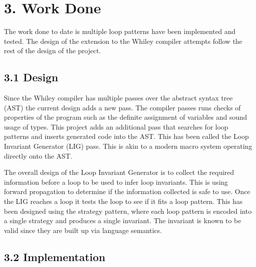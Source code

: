 \documentclass[11pt, a4paper, twoside, openright]{report}
\begin{document}
\section*{3. Work Done}

The work done to date is multiple loop patterns have been implemented and
tested. The design of the extension to the Whiley compiler attempts follow
the rest of the design of the project.

\subsection*{3.1 Design}

Since the Whiley compiler has multiple passes over the abstract syntax tree
(AST)
the current design adds a new pass. The compiler passes runs checks of properties
of the program such as the definite assignment of variables and sound usage of
types. This project adds an additional pass that searches for loop patterns and
inserts generated code into the AST.
This has been called the Loop Invariant Generator (LIG) pass.
This is akin to a modern macro system operating directly onto the AST.

The overall design of the Loop Invariant Generator is to collect the required
information before a loop to be used to infer loop invariants.
This is using forward propagation to determine if the
information collected is safe to use. Once the LIG reaches a loop
it tests the loop to see if it fits a loop pattern. This has been
designed using the strategy pattern, where each loop pattern is encoded
into a single strategy and produces a single invariant.
The invariant is known to be valid since they are built up via language
semantics.

\subsection*{3.2 Implementation}
\end{document}
